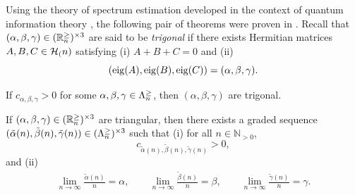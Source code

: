 \documentclass[notitlepage, 10pt]{article}
\begin{document}
Using the theory of spectrum estimation developed in the context of quantum information theory \cite{alicki1988symmetry,keyl2001estimating,hayashi2002quantum}, the following pair of theorems were proven in \cite{christandl2008quantum}.
Recall that $(\alpha,\beta,\gamma) \in (\mathbb R^{\geq}_{n})^{\times 3}$ are said to be \textit{trigonal} if there exists Hermitian matrices $A, B, C \in \mathcal H_{(}n)$ satisfying (i) $A+B+C=0$ and (ii)
\begin{equation}
    (\operatorname{eig}(A), \operatorname{eig}(B), \operatorname{eig}(C)) = (\alpha,\beta,\gamma).
\end{equation}

\begin{thm}
    \label{thm:LR_pos_implies_herm}
    If $c_{\alpha,\beta,\gamma} > 0$ for some $\alpha, \beta, \gamma \in \Lambda^{\geq}_{n}$, then $(\alpha,\beta,\gamma)$ are trigonal.
\end{thm}

\begin{thm}
    If $(\alpha,\beta,\gamma) \in (\mathbb R^{\geq}_{n})^{\times 3}$ are triangular, then there exists a graded sequence
    $(\tilde \alpha(n), \tilde \beta(n), \tilde \gamma(n)) \in (\Lambda^{\geq}_{n})^{\times 3}$ such that (i) for all $n \in \mathbb N_{>0}$,
    \begin{equation}
        c_{\tilde \alpha(n), \tilde \beta(n), \tilde \gamma(n)} > 0,
    \end{equation}
    and (ii)
    \begin{align}
        \lim_{n\to\infty} \frac{\tilde \alpha(n)}{n} = \alpha, \qquad
        \lim_{n\to\infty} \frac{\tilde \beta(n)}{n} = \beta, \qquad
        \lim_{n\to\infty} \frac{\tilde \gamma(n)}{n} = \gamma.
    \end{align}
\end{thm}
\end{document}

